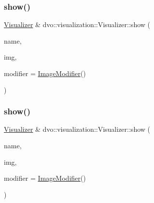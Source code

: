 \subsubsection{\texorpdfstring{show()}{show()}\hspace{0.1cm}{\footnotesize\ttfamily [2/4]}}
{\footnotesize\ttfamily \mbox{\hyperlink{classdvo_1_1visualization_1_1_visualizer}{Visualizer}} \& dvo\+::visualization\+::\+Visualizer\+::show (\begin{DoxyParamCaption}\item[{std\+::string \&}]{name,  }\item[{const cv\+::\+Mat\+Expr \&}]{img,  }\item[{\mbox{\hyperlink{classdvo_1_1visualization_1_1_visualizer_ac33e0b53e7ef7be64e3230f6c91084a0}{Image\+Modifier}}}]{modifier = {\ttfamily \mbox{\hyperlink{classdvo_1_1visualization_1_1_visualizer_ac33e0b53e7ef7be64e3230f6c91084a0}{Image\+Modifier}}()} }\end{DoxyParamCaption})}

\mbox{\label{classdvo_1_1visualization_1_1_visualizer_a4bf94bdc655c4723e71559de479eae44}} 
\subsubsection{\texorpdfstring{show()}{show()}\hspace{0.1cm}{\footnotesize\ttfamily [3/4]}}
{\footnotesize\ttfamily \mbox{\hyperlink{classdvo_1_1visualization_1_1_visualizer}{Visualizer}} \& dvo\+::visualization\+::\+Visualizer\+::show (\begin{DoxyParamCaption}\item[{const char $\ast$}]{name,  }\item[{const cv\+::\+Mat \&}]{img,  }\item[{\mbox{\hyperlink{classdvo_1_1visualization_1_1_visualizer_ac33e0b53e7ef7be64e3230f6c91084a0}{Image\+Modifier}}}]{modifier = {\ttfamily \mbox{\hyperlink{classdvo_1_1visualization_1_1_visualizer_ac33e0b53e7ef7be64e3230f6c91084a0}{Image\+Modifier}}()} }\end{DoxyParamCaption})}

\mbox{\label{classdvo_1_1visualization_1_1_visualizer_a5d7ddfc5ada5e75da5d9ddb428e17d24}} 
